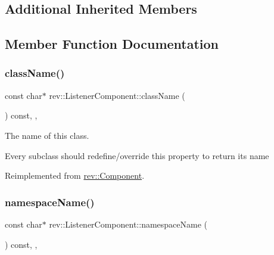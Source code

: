 \subsection*{Additional Inherited Members}


\subsection{Member Function Documentation}
\mbox{\label{classrev_1_1_listener_component_ab25dc63421b42bf388e9b1e57e635661}} 
\subsubsection{\texorpdfstring{className()}{className()}}
{\footnotesize\ttfamily const char$\ast$ rev\+::\+Listener\+Component\+::class\+Name (\begin{DoxyParamCaption}{ }\end{DoxyParamCaption}) const\hspace{0.3cm}{\ttfamily [inline]}, {\ttfamily [override]}, {\ttfamily [virtual]}}



The name of this class. 

Every subclass should redefine/override this property to return its name 

Reimplemented from \mbox{\hyperlink{classrev_1_1_component_a07619152d5acafe7a536df3a6a476349}{rev\+::\+Component}}.

\mbox{\label{classrev_1_1_listener_component_a83f62effee9c503dd7ee0b0322b0057e}} 
\subsubsection{\texorpdfstring{namespaceName()}{namespaceName()}}
{\footnotesize\ttfamily const char$\ast$ rev\+::\+Listener\+Component\+::namespace\+Name (\begin{DoxyParamCaption}{ }\end{DoxyParamCaption}) const\hspace{0.3cm}{\ttfamily [inline]}, {\ttfamily [override]}, {\ttfamily [virtual]}}



